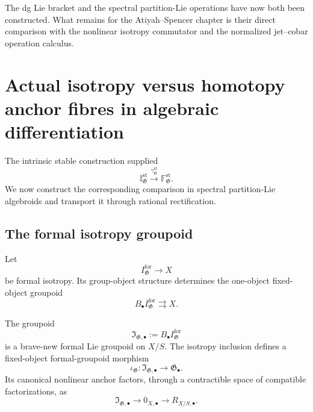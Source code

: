 \begin{remark}
\label{rem:bnla-dg-bracket-comparison-deferred}
The dg Lie bracket and the spectral partition-Lie operations have now both
been constructed.  What remains for the Atiyah--Spencer chapter is their
direct comparison with the nonlinear isotropy commutator and the normalized
jet--cobar operation calculus.
\end{remark}
\section{Actual isotropy versus homotopy anchor fibres in algebraic differentiation}
\label{sec:bnla-formal-isotropy-recognition}

The intrinsic stable construction supplied
\[
    \mathbb I^{\mathrm{st}}_{\mathfrak G}
    \xrightarrow{\gamma^{\mathrm{st}}_{\mathfrak G}}
    \mathbb F^{\mathrm{st}}_{\mathfrak G}.
\]
We now construct the corresponding comparison in spectral partition-Lie
algebroids and transport it through rational rectification.

\subsection{The formal isotropy groupoid}

Let
\[
    I^{\mathrm{for}}_{\mathfrak G}\longrightarrow X
\]
be formal isotropy.  Its group-object structure determines the one-object
fixed-object groupoid
\[
    B_\bullet I^{\mathrm{for}}_{\mathfrak G}
    \rightrightarrows X.
\]

\begin{proposition}
\label{prop:bnla-formal-isotropy-groupoid}
The groupoid
\[
    \mathfrak I_{\mathfrak G,\bullet}
    :=
    B_\bullet I^{\mathrm{for}}_{\mathfrak G}
\]
is a brave-new formal Lie groupoid on $X/S$.  The isotropy inclusion defines
a fixed-object formal-groupoid morphism
\[
    \iota_{\mathfrak G}:
    \mathfrak I_{\mathfrak G,\bullet}
    \longrightarrow
    \mathfrak G_\bullet.
\]
Its canonical nonlinear anchor factors, through a contractible space of
compatible factorizations, as
\[
    \mathfrak I_{\mathfrak G,\bullet}
    \longrightarrow
    0_{X,\bullet}
    \longrightarrow
    R_{X/S,\bullet}.
\]
\end{proposition}

